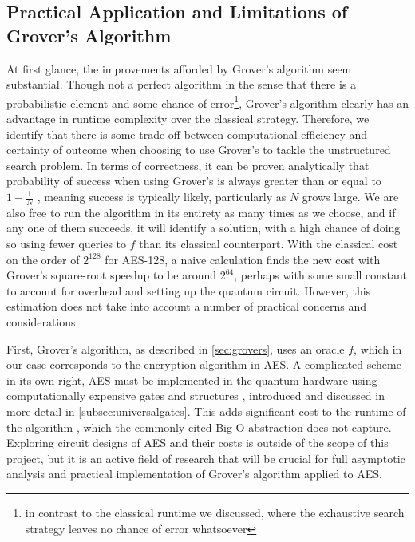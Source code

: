 \subsection{Practical Application and Limitations of Grover's Algorithm}\label{sec:parallelism_arg}
At first glance, the improvements afforded by Grover's algorithm seem substantial. Though not a perfect algorithm in the sense that there is a probabilistic element and some chance of error\footnote{in contrast to the classical runtime we discussed, where the exhaustive search strategy leaves no chance of error whatsoever}, Grover's algorithm clearly has an advantage in runtime complexity over the classical strategy. Therefore, we identify that there is some trade-off between computational efficiency and certainty of outcome when choosing to use Grover's to tackle the unstructured search problem. In terms of correctness, it can be proven analytically that probability of success when using Grover's is always greater than or equal to $1 - \frac{1}{N}$ \cite{Qiskit2023}, meaning success is typically likely, particularly as $N$ grows large. We are also free to run the algorithm in its entirety as many times as we choose, and if any one of them succeeds, it will identify a solution, with a high chance of doing so using fewer queries to $f$ than its classical counterpart. With the classical cost on the order of $2^{128}$ for AES-128, a naive calculation finds the new cost with Grover's square-root speedup to be around $2^{64}$, perhaps with some small constant to account for overhead and setting up the quantum circuit. However, this estimation does not take into account a number of practical concerns and considerations.

First, Grover's algorithm, as described in \cref{sec:grovers}, uses an oracle $f$, which in our case corresponds to the encryption algorithm in AES. A complicated scheme in its own right, AES must be implemented in the quantum hardware using computationally expensive gates and structures \cite{jaques2024ches_presentation,chen2025quantumcircuitimplementingaes}, introduced and discussed in more detail in \cref{subsec:universalgates}. This adds significant cost to the runtime of the algorithm \cite{jaques2024ches_presentation}, which the commonly cited Big O abstraction does not capture. %
Exploring circuit designs of AES and their costs is outside of the scope of this project, but it is an active field of research \cite{resourcefficientAES,cryptoeprint,chen2025quantumcircuitimplementingaes}
that will be crucial for full asymptotic analysis and practical implementation of Grover's algorithm applied to AES.

